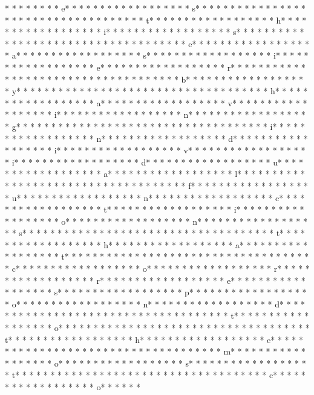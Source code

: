  * * *  *  * * *  * e* * *  * * *  * * *  *  * * *  *  * * *  * s* * *  * * *  * * *  *  * * *  *  * * *  *  * * *  * * *  * * *  *  * * *  *  * * *  * t* * *  * * *  * * *  *  * * *  *  * * *  * h* * *  * * *  * * *  *  * * *  *  * * *  * i* * *  * * *  * * *  *  * * *  *  * * *  * s* * *  * * *  * * *  *  * * *  *  * * *  *  * * *  * * *  * * *  *  * * *  *  * * *  * e* * *  * * *  * * *  *  * * *  *  * * *  * a* * *  * * *  * * *  *  * * *  *  * * *  * s* * *  * * *  * * *  *  * * *  *  * * *  * i* * *  * * *  * * *  *  * * *  *  * * *  * e* * *  * * *  * * *  *  * * *  *  * * *  * r* * *  * * *  * * *  *  * * *  *  * * *  *  * * *  * * *  * * *  *  * * *  *  * * *  * b* * *  * * *  * * *  *  * * *  *  * * *  * y* * *  * * *  * * *  *  * * *  *  * * *  *  * * *  * * *  * * *  *  * * *  *  * * *  * h* * *  * * *  * * *  *  * * *  *  * * *  * a* * *  * * *  * * *  *  * * *  *  * * *  * v* * *  * * *  * * *  *  * * *  *  * * *  * i* * *  * * *  * * *  *  * * *  *  * * *  * n* * *  * * *  * * *  *  * * *  *  * * *  * g* * *  * * *  * * *  *  * * *  *  * * *  *  * * *  * * *  * * *  *  * * *  *  * * *  * i* * *  * * *  * * *  *  * * *  *  * * *  * n* * *  * * *  * * *  *  * * *  *  * * *  * d* * *  * * *  * * *  *  * * *  *  * * *  * i* * *  * * *  * * *  *  * * *  *  * * *  * v* * *  * * *  * * *  *  * * *  *  * * *  * i* * *  * * *  * * *  *  * * *  *  * * *  * d* * *  * * *  * * *  *  * * *  *  * * *  * u* * *  * * *  * * *  *  * * *  *  * * *  * a* * *  * * *  * * *  *  * * *  *  * * *  * l* * *  * * *  * * *  *  * * *  *  * * *  *  * * *  * * *  * * *  *  * * *  *  * * *  * f* * *  * * *  * * *  *  * * *  *  * * *  * u* * *  * * *  * * *  *  * * *  *  * * *  * n* * *  * * *  * * *  *  * * *  *  * * *  * c* * *  * * *  * * *  *  * * *  *  * * *  * t* * *  * * *  * * *  *  * * *  *  * * *  * i* * *  * * *  * * *  *  * * *  *  * * *  * o* * *  * * *  * * *  *  * * *  *  * * *  * n* * *  * * *  * * *  *  * * *  *  * * *  * s* * *  * * *  * * *  *  * * *  *  * * *  *  * * *  * * *  * * *  *  * * *  *  * * *  * t* * *  * * *  * * *  *  * * *  *  * * *  * h* * *  * * *  * * *  *  * * *  *  * * *  * a* * *  * * *  * * *  *  * * *  *  * * *  * t* * *  * * *  * * *  *  * * *  *  * * *  *  * * *  * * *  * * *  *  * * *  *  * * *  * c* * *  * * *  * * *  *  * * *  *  * * *  * o* * *  * * *  * * *  *  * * *  *  * * *  * r* * *  * * *  * * *  *  * * *  *  * * *  * r* * *  * * *  * * *  *  * * *  *  * * *  * e* * *  * * *  * * *  *  * * *  *  * * *  * s* * *  * * *  * * *  *  * * *  *  * * *  * p* * *  * * *  * * *  *  * * *  *  * * *  * o* * *  * * *  * * *  *  * * *  *  * * *  * n* * *  * * *  * * *  *  * * *  *  * * *  * d* * *  * * *  * * *  *  * * *  *  * * *  *  * * *  * * *  * * *  *  * * *  *  * * *  * t* * *  * * *  * * *  *  * * *  *  * * *  * o* * *  * * *  * * *  *  * * *  *  * * *  *  * * *  * * *  * * *  *  * * *  *  * * *  * t* * *  * * *  * * *  *  * * *  *  * * *  * h* * *  * * *  * * *  *  * * *  *  * * *  * e* * *  * * *  * * *  *  * * *  *  * * *  *  * * *  * * *  * * *  *  * * *  *  * * *  * m* * *  * * *  * * *  *  * * *  *  * * *  * o* * *  * * *  * * *  *  * * *  *  * * *  * s* * *  * * *  * * *  *  * * *  *  * * *  * t* * *  * * *  * * *  *  * * *  *  * * *  *  * * *  * * *  * * *  *  * * *  *  * * *  * c* * *  * * *  * * *  *  * * *  *  * * *  * o* * *  * * *  